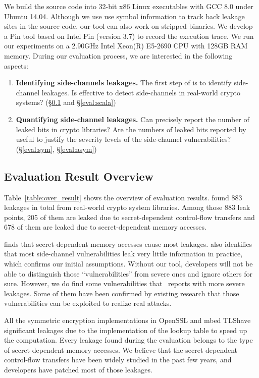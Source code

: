 We build the source code into 32-bit x86 Linux executables with GCC 8.0
under Ubuntu 14.04. Although we use use symbol information to track back leakage
sites in the source code, our tool can also work on stripped binaries. We
develop a Pin tool based on Intel Pin (version 3.7) to record the execution
trace. We run our experiments on a 2.90GHz Intel Xeon(R) E5-2690 CPU with 128GB
RAM memory. During our evaluation process, we are interested in the following
aspects:
\begin{enumerate}
    \item  \textbf{Identifying side-channels leakages.}
          The first step of \tool{} is to identify side-channel leakages. Is
          \tool{} effective to detect side-channels in real-world crypto
          systems? (\S\ref{sec:eval_overview} and \S\ref{eval:scala})
    \item  \textbf{Quantifying side-channel leakages.}
          Can \tool{} precisely report the number of leaked bits in crypto
          libraries? Are the numbers of leaked bits reported by \tool{} useful
          to justify the severity levels of the side-channel vulnerabilities?
          (\S\ref{eval:sym}, \S\ref{eval:asym})
\end{enumerate}

\subsection{Evaluation Result Overview} \label{sec:eval_overview}
Table~\ref{table:over_result} shows the overview of evaluation results. \tool{} found
883 leakages in total from real-world crypto system libraries. Among those 883
leak points, 205 of them are leaked due to secret-dependent control-flow
transfers and 678 of them are leaked due to secret-dependent memory accesses.

\tool{} finds that secret-dependent memory accesses
cause most leakages. \tool{} also identifies that most side-channel
vulnerabilities leak very little information in practice, which confirms our
initial assumptions.  Without our tool, developers will not be able to
distinguish those ``vulnerabilities'' from severe ones and ignore others for sure.
However, we do find some vulnerabilities that \tool\ reports with more severe
leakages. Some of them have been confirmed by existing research that those
vulnerabilities can be exploited to realize real attacks.

All the symmetric encryption implementations in OpenSSL and mbed TLS\@ have significant
leakages due to the implementation of the lookup table to speed up the
computation. Every leakage found during the evaluation belongs to the type of
secret-dependent memory accesses. We believe that the secret-dependent
control-flow transfers have been widely studied in the past few years, and
developers have patched most of those leakages. 

